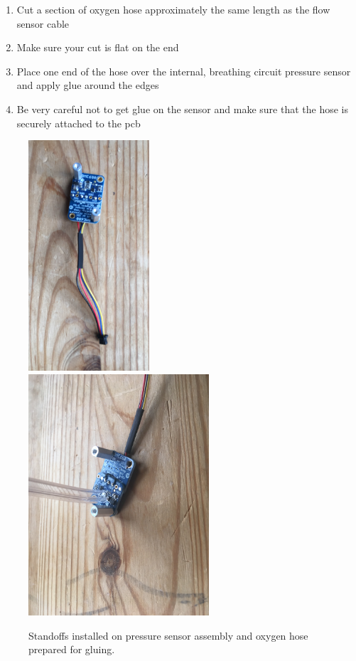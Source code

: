 \documentclass[11pt, letterpaper]{article}
\begin{document}
\begin{enumerate}
\begin{enumerate}[label=5.\arabic*]
\begin{enumerate}[label=5.1.\arabic*]
\item
Cut a section of oxygen hose approximately the same length as the flow sensor cable
\item
Make sure your cut is flat on the end
\item
Place one end of the hose over the internal, breathing circuit pressure sensor and apply glue around the edges
\item
Be very careful not to get glue on the sensor and make sure that the hose is securely attached to the pcb
\end{enumerate}
\begin{figure}[H]
\centering
\includegraphics[width=0.4\textwidth]{bme_standoffs.JPG}
\includegraphics[width=0.6\textwidth, angle =90 ]{hotglue.JPG}
\caption{Standoffs installed on pressure sensor assembly and oxygen hose prepared for gluing.}
\label{fig:bme_glue}
\end{figure}


\end{enumerate}
\end{enumerate}
\end{document}
